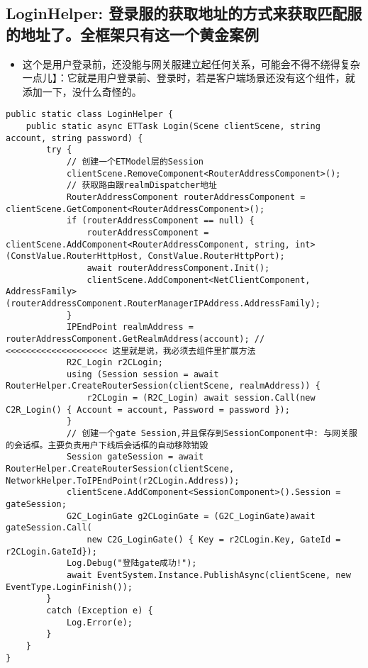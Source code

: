 \documentclass[9pt, b5paper]{article}
\begin{document}
\subsection{LoginHelper: 登录服的获取地址的方式来获取匹配服的地址了。全框架只有这一个黄金案例}
\label{sec-1-12}
\begin{itemize}
\item 这个是用户登录前，还没能与网关服建立起任何关系，可能会不得不绕得复杂一点儿】：它就是用户登录前、登录时，若是客户端场景还没有这个组件，就添加一下，没什么奇怪的。
\end{itemize}
\begin{verbatim}
public static class LoginHelper {
    public static async ETTask Login(Scene clientScene, string account, string password) {
        try {
            // 创建一个ETModel层的Session
            clientScene.RemoveComponent<RouterAddressComponent>();
            // 获取路由跟realmDispatcher地址
            RouterAddressComponent routerAddressComponent = clientScene.GetComponent<RouterAddressComponent>();
            if (routerAddressComponent == null) {
                routerAddressComponent = clientScene.AddComponent<RouterAddressComponent, string, int>(ConstValue.RouterHttpHost, ConstValue.RouterHttpPort);
                await routerAddressComponent.Init();
                clientScene.AddComponent<NetClientComponent, AddressFamily>(routerAddressComponent.RouterManagerIPAddress.AddressFamily);
            }
            IPEndPoint realmAddress = routerAddressComponent.GetRealmAddress(account); // <<<<<<<<<<<<<<<<<<<< 这里就是说，我必须去组件里扩展方法
            R2C_Login r2CLogin;
            using (Session session = await RouterHelper.CreateRouterSession(clientScene, realmAddress)) {
                r2CLogin = (R2C_Login) await session.Call(new C2R_Login() { Account = account, Password = password });
            }
            // 创建一个gate Session,并且保存到SessionComponent中: 与网关服的会话框。主要负责用户下线后会话框的自动移除销毁
            Session gateSession = await RouterHelper.CreateRouterSession(clientScene, NetworkHelper.ToIPEndPoint(r2CLogin.Address));
            clientScene.AddComponent<SessionComponent>().Session = gateSession;
            G2C_LoginGate g2CLoginGate = (G2C_LoginGate)await gateSession.Call(
                new C2G_LoginGate() { Key = r2CLogin.Key, GateId = r2CLogin.GateId});
            Log.Debug("登陆gate成功!");
            await EventSystem.Instance.PublishAsync(clientScene, new EventType.LoginFinish());
        }
        catch (Exception e) {
            Log.Error(e);
        }
    } 
}
\end{verbatim}
\end{document}

